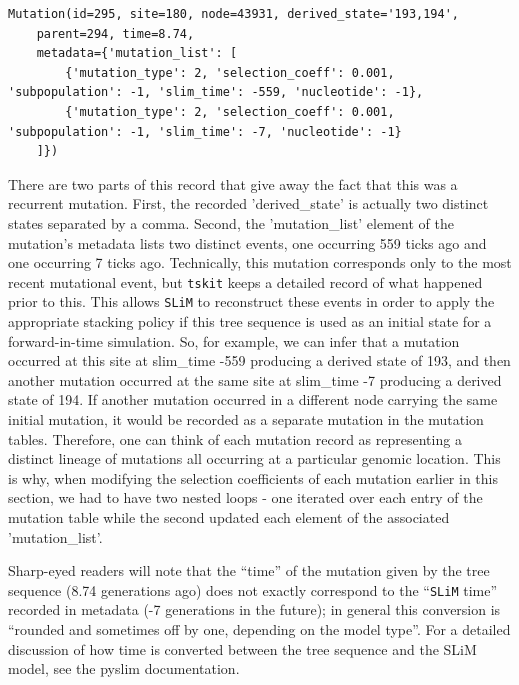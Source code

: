 \documentclass[12pt]{article}
\newcommand{\tskit}[0]{\texttt{tskit}\xspace}
\newcommand{\slim}[0]{\texttt{SLiM}\xspace}
\begin{document}
\begin{listing}[H]
    \begin{verbatim}
Mutation(id=295, site=180, node=43931, derived_state='193,194',
    parent=294, time=8.74,
    metadata={'mutation_list': [
        {'mutation_type': 2, 'selection_coeff': 0.001, 'subpopulation': -1, 'slim_time': -559, 'nucleotide': -1},
        {'mutation_type': 2, 'selection_coeff': 0.001, 'subpopulation': -1, 'slim_time': -7, 'nucleotide': -1}
    ]})
    \end{verbatim}
\end{listing}

There are two parts of this record that give away the fact that this was a recurrent mutation. First, the recorded 'derived_state' is
actually two distinct states separated by a comma. Second, the 'mutation_list' element of the mutation's metadata lists two distinct
events, one occurring 559 ticks ago and one occurring 7 ticks ago. Technically, this mutation corresponds only to the most recent
mutational event, but \tskit keeps a detailed record of what happened prior to this. This allows \slim to reconstruct these events in order
to apply the appropriate stacking policy if this tree sequence is used as an initial state for a forward-in-time simulation. So, for example,
we can infer that a mutation occurred at this site at slim_time -559 producing a derived state of 193, and then another mutation
occurred at the same site at slim_time -7 producing a derived state of 194. If another mutation occurred in a different node carrying
the same initial mutation, it would be recorded as a separate mutation in the mutation tables. Therefore, one can think of each mutation
record as representing a distinct lineage of mutations all occurring at a particular genomic location. This is why, when modifying
the selection coefficients of each mutation earlier in this section, we had to have two nested loops - one iterated over each entry of the
mutation table while the second updated each element of the associated 'mutation_list'.

Sharp-eyed readers will note that the ``time'' of the mutation given by the tree sequence (8.74 generations ago) does not exactly
correspond to the ``\slim time'' recorded in metadata (-7 generations in the future); in general this conversion is ``rounded and sometimes
off by one, depending on the model type''. For a detailed discussion of how time is converted between the tree sequence and the SLiM
model, see the pyslim documentation.
\end{document}
